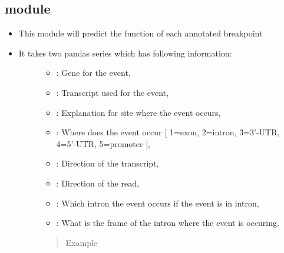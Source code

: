 \documentclass[letterpaper,10pt,english]{sphinxmanual}
\begin{document}
\subsection{ module}
\label{\detokenize{iAnnotateSV:predictfunction-module}}\begin{itemize}
\item {} 
This module will predict the function of each annotated breakpoint

\item {} \begin{description}
\item[{It takes two pandas series which has following information:}] \leavevmode\begin{itemize}
\item {} 
 : Gene for the event,

\item {} 
 : Transcript used for the event,

\item {} 
 : Explanation for site where the event occurs,

\item {} 
 : Where does the event occur {[} 1=exon, 2=intron, 3=3’-UTR, 4=5’-UTR, 5=promoter {]},

\item {} 
 : Direction of the transcript,

\item {} 
 : Direction of the read,

\item {} 
 : Which intron the event occurs if the event is in intron,

\item {} 
 : What is the frame of the intron where the event is occuring.

\end{itemize}
\begin{quote}\begin{description}
\item[{Example}] \leavevmode
{}



\end{description}
\end{quote}
\end{description}
\end{itemize}
\end{document}

